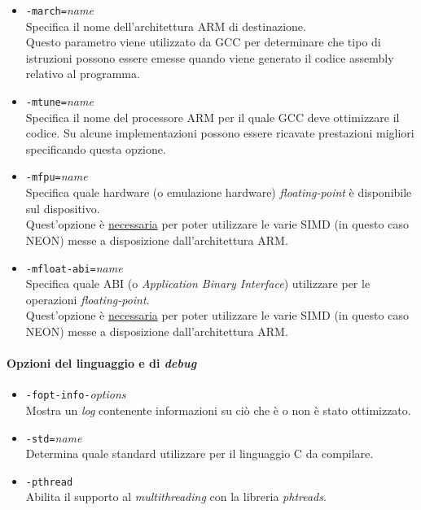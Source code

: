 \begin{itemize}
  
  \item \verb|-march=|\emph{name}\\
  Specifica il nome dell'architettura ARM di destinazione.\\
  Questo parametro viene utilizzato da GCC per determinare che tipo di 
  istruzioni possono essere emesse quando viene generato il codice assembly 
  relativo al programma.
  
  \item \verb|-mtune=|\emph{name}\\
  Specifica il nome del processore ARM per il quale GCC deve ottimizzare il 
  codice. Su alcune implementazioni possono essere ricavate prestazioni 
  migliori specificando questa opzione.
  
  \item \verb|-mfpu=|\emph{name}\\
  Specifica quale hardware (o emulazione hardware) \emph{floating-point} è 
  disponibile sul dispositivo.\\
  Quest'opzione è \underline{necessaria} per poter utilizzare le varie SIMD (in 
  questo caso NEON) messe a disposizione dall'architettura ARM.
  
  \item \verb|-mfloat-abi=|\emph{name}\\
  Specifica quale ABI (o \emph{Application Binary Interface}) utilizzare per le 
  operazioni \emph{floating-point}. \\
  Quest'opzione è \underline{necessaria} per poter utilizzare le varie SIMD (in 
  questo caso NEON) messe a disposizione dall'architettura ARM.
  
\end{itemize}

\paragraph{Opzioni del linguaggio e di \emph{debug}}

\begin{itemize}
  
  \item \verb|-fopt-info-|\emph{options}\\
  Mostra un \emph{log} contenente informazioni su ciò che è o non è stato 
  ottimizzato.
  
  \item \verb|-std=|\emph{name}\\
  Determina quale standard utilizzare per il linguaggio C da compilare.
  
  \item \verb|-pthread|\\
  Abilita il supporto al \emph{multithreading} con la libreria \emph{phtreads}.
  
\end{itemize}

